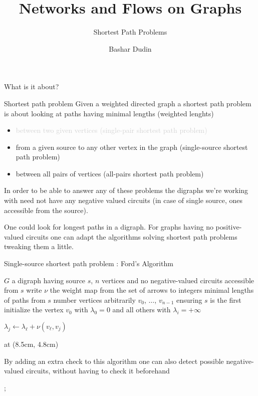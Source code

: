 \documentclass[32pt,aspectratio=169, handout]{beamer}
\author[BD]{Bashar Dudin}
\institute[]{EPITA}
\title{Networks and Flows on Graphs} %
\subtitle{Shortest Path Problems}
\begin{document}
\begin{frame}[plain]
\titlepage %
\end{frame}

\begin{frame}{What is it about?}
  \begin{halfshyblock}{Shortest path problem}
    Given a weighted directed graph a shortest path problem is about
    looking at paths having minimal lengths (weighted lenghts)
    \begin{itemize}
    \item[\textcolor<2->{lightgray}{\textbullet}] \textcolor<2->{lightgray}{between two given vertices (single-pair shortest path problem)}
    \item from a given source to any other vertex in the graph (single-source shortest path problem)
    \item between all pairs of vertices (all-pairs shortest path problem)
    \end{itemize}
  \end{halfshyblock}
  \pause[3]In order to be able to answer any of these problems the digraphs
  we're working with need not have any negative valued
  circuits (in case of single source, ones accessible from the source).
  \pause[4]
  \begin{rem}
    One could look for longest paths in a digraph. For graphs having no
    positive-valued circuits one can adapt the algorithms solving
    shortest path problems tweaking them a little.
  \end{rem}
\end{frame}

\begin{frame}[t]{Single-source shortest path problem : Ford's Algorithm}
  \small{
    \begin{algorithmic}[1]
      \Require $G$ a digraph having source $s$, $n$
      vertices and no negative-valued circuits accessible from $s$
      \Statex write $\nu$ the weight map from the set of arrows to integers
      \Ensure minimal lengths of paths from $s$
      \State number vertices arbitrarily $v_0$, $\ldots$, $v_{n-1}$ ensuring $s$ is the first
      \State initialize the vertex $v_0$ with $\lambda_0 =0$ and all others with $\lambda_i = +\infty$

      \Statex
      \State $\lambda_j \gets \lambda_\ell + \nu(v_\ell, v_j)$
      \EndIf
      \EndFor
      \EndFor

    \end{algorithmic}
  }
  \tikzoverlay[text width=5.5cm] at (8.5cm, 4.8cm) {
    \begin{tcolorbox}[
      enhanced,
      parbox = false,
      colback=mLightBrown!10!white,
      colframe=mLightBrown,
      arc=0mm,
      ]
      \small{By adding an extra check to this algorithm one can also
        detect possible negative-valued circuits, without having to
        check it beforehand}
    \end{tcolorbox}%
  };
\end{frame}
\end{document}
